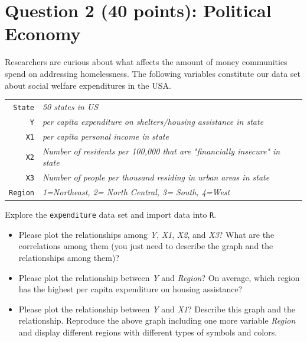 \documentclass[12pt,letterpaper]{article}
\begin{document}
	\section*{Question 2 (40 points): Political Economy}

\noindent Researchers are curious about what affects the amount of money communities spend on addressing homelessness. The following variables constitute our data set about social welfare expenditures in the USA. \\
\vspace{.5cm}


\begin{tabular}{r|l}
	\texttt{State} &\emph{50 states in US} \\
	\texttt{Y} & \emph{per capita expenditure on shelters/housing assistance in state}\\
	\texttt{X1} &\emph{per capita personal income in state} \\
	\texttt{X2} &  \emph{Number of residents per 100,000 that are "financially insecure" in state}\\
	\texttt{X3} &  \emph{Number of people per thousand residing in urban areas in state} \\
	\texttt{Region} &  \emph{1=Northeast, 2= North Central, 3= South, 4=West} \\
\end{tabular}

\vspace{.5cm}
\noindent Explore the \texttt{expenditure} data set and import data into \texttt{R}.
\vspace{.5cm}
  
\vspace{.5cm}
\begin{itemize}

\item
Please plot the relationships among \emph{Y}, \emph{X1}, \emph{X2}, and \emph{X3}? What are the correlations among them (you just need to describe the graph and the relationships among them)?
\vspace{.5cm}
\item
Please plot the relationship between \emph{Y} and \emph{Region}? On average, which region has the highest per capita expenditure on housing assistance?
\vspace{.5cm}
\item
Please plot the relationship between \emph{Y} and \emph{X1}? Describe this graph and the relationship. Reproduce the above graph including one more variable \emph{Region} and display different regions with different types of symbols and colors.
\end{itemize}
\end{document}
